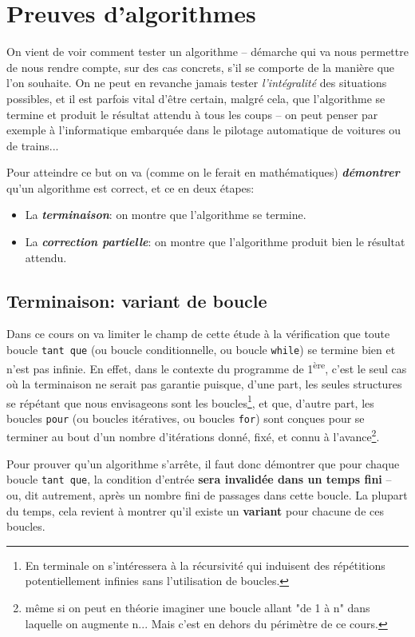 \documentclass[12pt]{article}
\begin{document}
	\pagebreak
	\section{Preuves d'algorithmes}
	On vient de voir comment tester un algorithme -- démarche qui va nous permettre de nous rendre compte, sur des cas concrets, s'il se comporte de la manière que l'on souhaite. On ne peut en revanche jamais tester \textit{l'intégralité} des situations possibles, et il est parfois vital d'être certain, malgré cela, que l'algorithme se termine et produit le résultat attendu à tous les coups -- on peut penser par exemple à l'informatique embarquée dans le pilotage automatique de voitures ou de trains...
	
	Pour atteindre ce but on va (comme on le ferait en mathématiques) \textbf{\textit{démontrer}} qu'un algorithme est correct, et ce en deux étapes:
	\begin{itemize}
		\item La \textbf{\textit{terminaison}}: on montre que l'algorithme se termine.
		\item La \textbf{\textit{correction partielle}}: on montre que l'algorithme produit bien le résultat attendu.
	\end{itemize}
	
	\subsection{Terminaison: variant de boucle}
	Dans ce cours on va limiter le champ de cette étude à la vérification que toute boucle \texttt{tant que} (ou boucle conditionnelle, ou boucle \texttt{while}) se termine bien et n'est pas infinie. En effet, dans le contexte du programme de 1\textsuperscript{ère}, c'est le seul cas où la terminaison ne serait pas garantie puisque, d'une part, les seules structures se répétant que nous envisageons sont les boucles\footnote{En terminale on s'intéressera à la récursivité qui induisent des répétitions potentiellement infinies sans l'utilisation de boucles.}, et que, d'autre part, les boucles \texttt{pour} (ou boucles itératives, ou boucles \texttt{for}) sont conçues pour se terminer au bout d'un nombre d'itérations donné, fixé, et connu à l'avance\footnote{même si on peut en théorie imaginer une boucle allant "de 1 à n" dans laquelle on augmente n... Mais c'est en dehors du périmètre de ce cours.}.
	
	Pour prouver qu’un algorithme s'arrête, il faut donc démontrer que pour chaque boucle \texttt{tant que}, la condition d'entrée \textbf{sera invalidée dans un temps fini} -- ou, dit autrement, après un nombre fini de passages dans cette boucle. La plupart du temps, cela revient à montrer qu'il existe un \textbf{variant} pour chacune de ces boucles.
	
\end{document}
